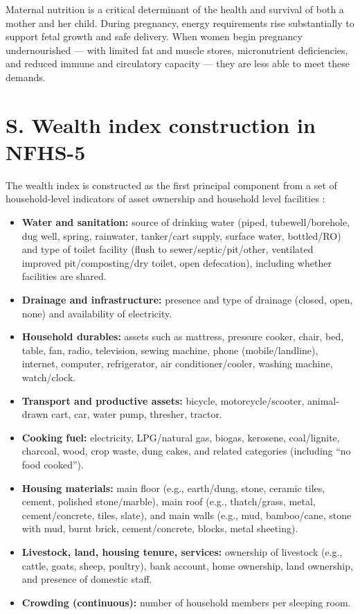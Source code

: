 Maternal nutrition is a critical determinant of the health and survival of both a mother and her child. During pregnancy, energy requirements rise substantially to support fetal growth and safe delivery. When women begin pregnancy undernourished — with limited fat and muscle stores, micronutrient deficiencies, and reduced immune and circulatory capacity — they are less able to meet these demands. 



\section{S. Wealth index construction in NFHS-5}
\label{wealth_index}

The wealth index is constructed as the first principal component from a set of household-level indicators of asset ownership and household level facilities \citep{DHSIndiaWealth2019}:

\begin{itemize}
\item \textbf{Water and sanitation:} source of drinking water (piped, tubewell/borehole, dug well, spring, rainwater, tanker/cart supply, surface water, bottled/RO) and type of toilet facility (flush to sewer/septic/pit/other, ventilated improved pit/composting/dry toilet, open defecation), including whether facilities are shared.
\item \textbf{Drainage and infrastructure:} presence and type of drainage (closed, open, none) and availability of electricity.
\item \textbf{Household durables:} assets such as mattress, pressure cooker, chair, bed, table, fan, radio, television, sewing machine, phone (mobile/landline), internet, computer, refrigerator, air conditioner/cooler, washing machine, watch/clock.
\item \textbf{Transport and productive assets:} bicycle, motorcycle/scooter, animal-drawn cart, car, water pump, thresher, tractor.
\item \textbf{Cooking fuel:} electricity, LPG/natural gas, biogas, kerosene, coal/lignite, charcoal, wood, crop waste, dung cakes, and related categories (including “no food cooked”).
\item \textbf{Housing materials:} main floor (e.g., earth/dung, stone, ceramic tiles, cement, polished stone/marble), main roof (e.g., thatch/grass, metal, cement/concrete, tiles, slate), and main walls (e.g., mud, bamboo/cane, stone with mud, burnt brick, cement/concrete, blocks, metal sheeting).
\item \textbf{Livestock, land, housing tenure, services:} ownership of livestock (e.g., cattle, goats, sheep, poultry), bank account, home ownership, land ownership, and presence of domestic staff.
\item \textbf{Crowding (continuous):} number of household members per sleeping room.

\end{itemize}

